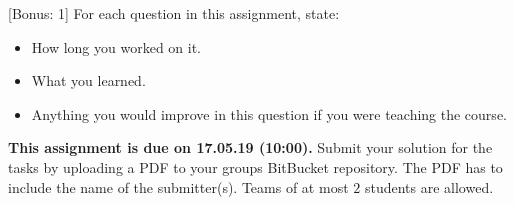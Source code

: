 \documentclass{exam}
\newcommand{\duedate}{17.05.19 (10:00)}
\newcommand{\due}{{\bf This assignment is due on \duedate.} }
\begin{document}
\begin{questions}
	[Bonus: 1]
	For each question in this assignment, state:
	\begin{itemize}
	\item How long you worked on it.
	\item What you learned.
	\item Anything you would improve in this question if you were teaching the course.
	\end{itemize}
	\end{questions}
	
	\noindent
	\due Submit your solution for the tasks by uploading a PDF to your groups BitBucket repository. The PDF has to include the name of the submitter(s). Teams of at most $2$ students are allowed.
\end{document}

